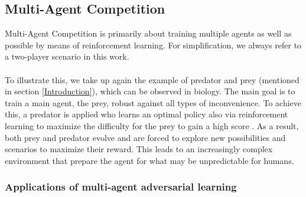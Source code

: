 \subsection{Multi-Agent Competition}
\label{multiagent}
Multi-Agent Competition is primarily about training multiple agents as well as possible by means of reinforcement learning. For simplification, we always refer to a two-player scenario in this work.\\
\\
To illustrate this, we take up again the example of predator and prey (mentioned in section \ref{Introduction}), which can be observed in biology.
The main goal is to train a main agent, the prey, robust against all types of inconvenience.
To achieve this, a predator is applied who learns an optimal policy also via reinforcement learning to maximize the difficulty for the prey to gain a high score \cite{robustPinto2017Mar}. As a result, both prey and predator evolve and are forced to explore new possibilities and scenarios to maximize their reward. This leads to an increasingly complex environment that prepare the agent for what may be unpredictable for humans.

\subsubsection{Applications of multi-agent adversarial learning}
\label{appl_train}

